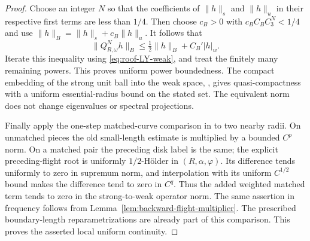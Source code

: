 \begin{proof}
Choose an integer $N$ so that the coefficients of $\|h\|_s$ and
$\|h\|_u$ in their respective first terms are less than $1/4$.
Then choose $c_B>0$ with $c_B C_B C_3^N<1/4$ and use
$\|h\|_B=\|h\|_s+c_B\|h\|_u$. It follows that
\[
 \|Q_{R,\omega}^N h\|_B\le\tfrac12\|h\|_B+C_B'|h|_w.
\]
Iterate this inequality using \eqref{eq:roof-LY-weak}, and treat the
finitely many remaining powers. This proves uniform power boundedness.
The compact embedding of the strong unit ball into the weak space,
\cite[Lemma 3.2(d)]{DPZ}, gives quasi-compactness with a uniform
essential-radius bound on the stated set. The equivalent norm does not
change eigenvalues or spectral projections.

Finally apply the one-step matched-curve comparison in
\cite[Section 5 and Theorem 2.6]{DZ} to two nearby radii. On unmatched
pieces the old small-length estimate is multiplied by a bounded
$C^p$ norm. On a matched pair the preceding disk label is the same;
the explicit preceding-flight root is uniformly $1/2$-H\"older in
$(R,\alpha,\varphi)$. Its difference tends uniformly to zero in
supremum norm, and interpolation with its uniform $C^{1/2}$ bound
makes the difference tend to zero in $C^q$. Thus the added weighted
matched term tends to zero in the strong-to-weak operator norm. The
same assertion in frequency follows from Lemma~\ref{lem:backward-flight-multiplier}.
The prescribed boundary-length reparametrizations are already part of
this comparison. This proves the asserted local uniform continuity.
\end{proof}

